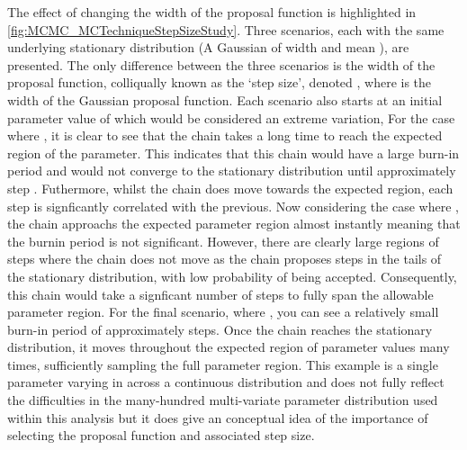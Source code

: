 The effect of changing the width of the proposal function is highlighted in \autoref{fig:MCMC_MCTechniqueStepSizeStudy}. Three scenarios, each with the same underlying stationary distribution (A Gaussian of width  and mean ), are presented. The only difference between the three scenarios is the width of the proposal function, colliqually known as the `step size', denoted , where \quickmath{\sigma} is the width of the Gaussian proposal function. Each scenario also starts at an initial parameter value of  which would be considered an extreme variation, For the case where , it is clear to see that the chain takes a long time to reach the expected region of the parameter. This indicates that this chain would have a large burn-in period and would not converge to the stationary distribution until approximately step . Futhermore, whilst the chain does move towards the expected region, each step is signficantly correlated with the previous. Now considering the case where , the chain approachs the expected parameter region almost instantly meaning that the burnin period is not significant. However, there are clearly large regions of steps where the chain does not move as the chain proposes steps in the tails of the stationary distribution, with low probability of being accepted. Consequently, this chain would take a signficant number of steps to fully span the allowable parameter region. For the final scenario, where , you can see a relatively small burn-in period of approximately  steps. Once the chain reaches the stationary distribution, it moves throughout the expected region of parameter values many times, sufficiently sampling the full parameter region. This example is a single parameter varying in across a continuous distribution and does not fully reflect the difficulties in the many-hundred multi-variate parameter distribution used within this analysis but it does give an conceptual idea of the importance of selecting the proposal function and associated step size. 

